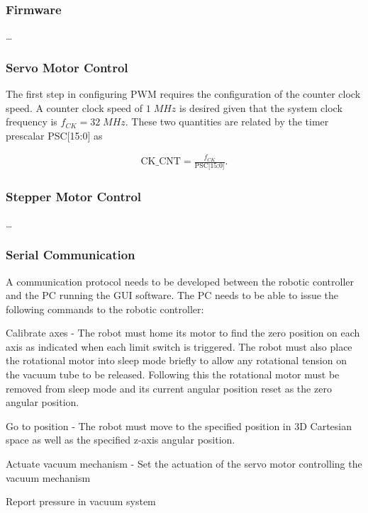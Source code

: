 \subsubsection{Firmware}

\ldots

\subsubsection{Servo Motor Control}

The first step in configuring PWM requires the configuration of the counter clock speed. A counter clock speed of $1\;MHz$ is desired given that the system clock frequency is $f_{CK}=32\;MHz$. These two quantities are related by the timer prescalar PSC[15:0] as

\begin{align}
	\text{CK\_CNT}=\frac{f_{CK}}{\text{PSC[15:0]}}.
	\label{pwm-counter-clock}
\end{align}


\subsubsection{Stepper Motor Control}

\ldots

\subsubsection{Serial Communication}

A communication protocol needs to be developed between the robotic controller and the PC running the GUI software. The PC needs to be able to issue the following commands to the robotic controller:

\begin{compactitem}
	\item Calibrate axes - The robot must home its motor to find the zero position on each axis as indicated when each limit switch is triggered. The robot must also place the rotational motor into sleep mode briefly to allow any rotational tension on the vacuum tube to be released. Following this the rotational motor must be removed from sleep mode and its current angular position reset as the zero angular position. 
	\item Go to position - The robot must move to the specified position in 3D Cartesian space as well as the specified z-axis angular position.
	\item Actuate vacuum mechanism - Set the actuation of the servo motor controlling the vacuum mechanism
	\item Report pressure in vacuum system
\end{compactitem}


